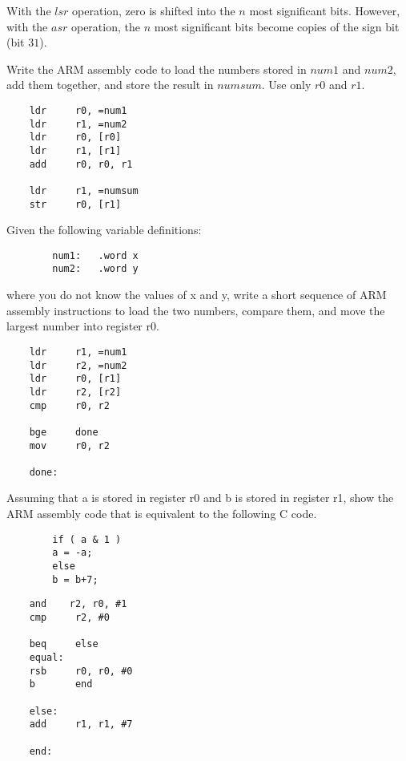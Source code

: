 \documentclass[12pt]{article}
\newenvironment{problem}[2][Problem]{\begin{trivlist}
\item[\hskip \labelsep {\bfseries #1}\hskip \labelsep {\bfseries #2.}]}{\end{trivlist}}
\begin{document}
With the $lsr$ operation, zero is shifted into the $n$ most significant bits.
However, with the $asr$ operation, the $n$ most significant bits become copies of the sign bit (bit $31$).


\begin{problem}{4.4}
    Write the ARM assembly code to load the numbers stored in $num1$ and $num2$, add them together, and store the result in $numsum$. Use only $r0$ and $r1$.
\end{problem}

\begin{verbatim}
    ldr     r0, =num1
    ldr     r1, =num2
    ldr     r0, [r0]
    ldr     r1, [r1]
    add     r0, r0, r1
    
    ldr     r1, =numsum
    str     r0, [r1]
\end{verbatim}


\begin{problem}{4.5}
    Given the following variable definitions:
    \begin{verbatim}
        num1:   .word x
        num2:   .word y
    \end{verbatim}
    where you do not know the values of x and y, write a short sequence of ARM assembly instructions to load the two numbers, compare them, and move the largest number into register r0.
\end{problem}

\begin{verbatim}
    ldr     r1, =num1
    ldr     r2, =num2
    ldr     r0, [r1]
    ldr     r2, [r2]
    cmp     r0, r2

    bge     done
    mov     r0, r2

    done:
\end{verbatim}


\begin{problem}{4.6}
    Assuming that a is stored in register r0 and b is stored in register r1, show the ARM assembly code that is equivalent to the following C code.
    \begin{verbatim}
        if ( a & 1 )
        a = -a;
        else
        b = b+7;
    \end{verbatim}

\end{problem}

\begin{verbatim}
    and    r2, r0, #1  
    cmp     r2, #0

    beq     else
    equal:
    rsb     r0, r0, #0
    b       end

    else:
    add     r1, r1, #7  

    end:
\end{verbatim}
\end{document}
